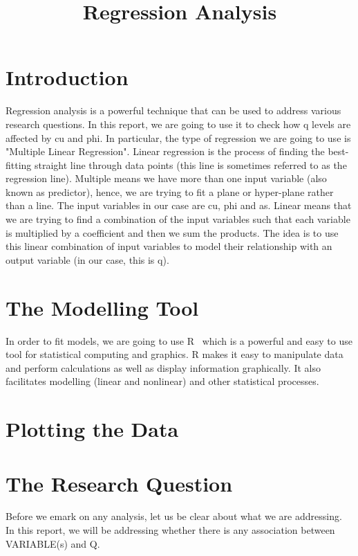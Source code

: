 \documentclass[a4paper,12pt, english]{article}
\begin{document}
\title{Regression Analysis}
\maketitle

\section{Introduction}
Regression analysis is a powerful technique that can be used to address various research questions. In this report, we are going to use it to check how q levels are affected by cu and phi. In particular, the type of regression we are going to use is "Multiple Linear Regression". Linear regression is the process of finding the best-fitting straight line through data points (this line is sometimes referred to as the regression line). Multiple means we have more than one input variable (also known as predictor), hence, we are trying to fit a plane or hyper-plane rather than a line.  The input variables in our case are cu, phi and as. Linear means that we are trying to find a combination of the input variables such that each variable is multiplied by a coefficient and then we sum the products. The idea is to use this linear combination of input variables to model their relationship with an output variable (in our case, this is q).

\section{The Modelling Tool}
In order to fit models, we are going to use R~\cite{R} which is a powerful and easy to use tool for statistical computing and graphics. R makes it easy to manipulate data and perform calculations as well as display information graphically. It also facilitates modelling (linear and nonlinear) and other statistical processes.
\section{Plotting the Data}

\section{The Research Question}
Before we emark on any analysis, let us be clear about what we are addressing.\\
In this report, we will be addressing whether there is any association between VARIABLE(s) and Q.
\end{document}
